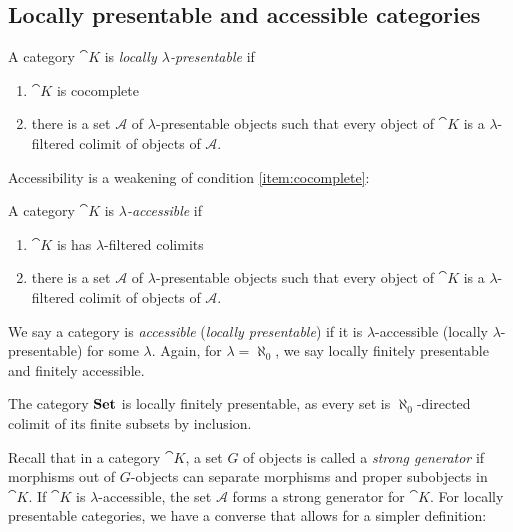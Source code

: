 \subsection{Locally presentable and accessible categories}


\begin{Definition}
A category $\cat K$ is \emph{locally $\lambda$-presentable} if
\begin{enumerate}
\item $\cat K$ is cocomplete \label{item:cocomplete}
\item there is a set $\mathcal A$ of $\lambda$-presentable objects such that every object of $\cat K$ is a $\lambda$-filtered colimit of objects of $\mathcal A$.
\end{enumerate}
\end{Definition}

Accessibility is a weakening of condition \ref{item:cocomplete}:

\begin{Definition}
A category $\cat K$ is \emph{$\lambda$-accessible} if
\begin{enumerate}
\item $\cat K$ is has $\lambda$-filtered colimits
\item there is a set $\mathcal A$ of $\lambda$-presentable objects such that every object of $\cat K$ is a $\lambda$-filtered colimit of objects of $\mathcal A$.
\end{enumerate}
\end{Definition}

We say a category is \emph{accessible} (\emph{locally presentable}) if it is $\lambda$-accessible (locally $\lambda$-presentable) for some $\lambda$. Again, for $\lambda = \aleph_0$, we say locally finitely presentable and finitely accessible. 

\begin{Example}
The category $\mathbf{Set}$ is locally finitely presentable, as every set is $\aleph_0$-directed colimit of its finite subsets by inclusion.
\end{Example}

Recall that in a category $\cat K$, a set $G$ of objects is called a \emph{strong generator} if morphisms out of $G$-objects can separate morphisms and proper subobjects in $\cat K$. If $\cat K$ is $\lambda$-accessible, the set $\mathcal A$ forms a strong generator for $\cat K$. For locally presentable categories, we have a converse that allows for a simpler definition:

